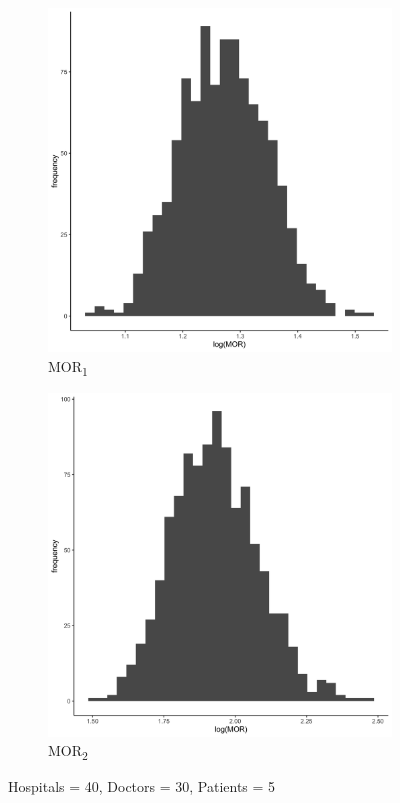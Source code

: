\documentclass[
  letterpaper,
  DIV=11,
  numbers=noendperiod,
  titlepage]{scrartcl}
\begin{document}
\vspace{10mm}

\begin{figure}
\centering
\begin{subfigure}{.49\textwidth}
    \centering
    \includegraphics[width=.95\linewidth]{../../plots/three-lvl-ran-int/high-prev/hist_40_30_5_three_lvl_high_prev_mor1.png}  
    \caption{MOR\textsubscript{1}}
    \label{l40m30n51}
\end{subfigure}
\begin{subfigure}{.49\textwidth}
    \centering
    \includegraphics[width=.95\linewidth]{../../plots/three-lvl-ran-int/high-prev/hist_40_30_5_three_lvl_high_prev_mor2.png}
    \caption{MOR\textsubscript{2}}
    \label{l40m30n52}
\end{subfigure}
\caption{Hospitals = 40, Doctors = 30, Patients = 5}
\label{mor2}
\end{figure}
\end{document}
